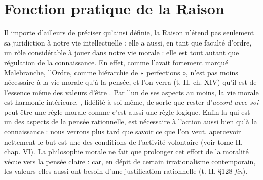 \section{Fonction pratique de la Raison}%
Il importe d’ailleurs
de préciser qu’ainsi définie, la Raison n’étend pas seulement sa juridiction à notre vie intellectuelle : elle a aussi, en tant que faculté
d’ordre, un rôle considérable à jouer dans notre vie morale : elle est
 tout autant que régulation de la connaissance.
En effet, comme l'avait fortement marqué Malebranche, l'Ordre,
comme hiérarchie de « perfections », n’est pas moins nécessaire à la
vie morale qu’à la pensée, et l’on verra (t. II, ch. XIV) qu’il est
de l'essence même des valeurs d’être . Par l’un de ses
aspects au moins, la vie morale est harmonie intérieure, ,
fidélité à soi-même, de sorte que rester d’{\it accord avec soi} peut être
une règle morale comme c’est aussi une règle logique. Enfin la  qui est un des aspects de la pensée rationnelle, est nécessaire
à l’action aussi bien qu’à la connaissance : nous verrons plus tard
que savoir ce que l’on veut, apercevoir nettement le but est une des
conditions de l’activité volontaire (voir tome II, chap. VI). La
philosophie morale ne fait que prolonger cet effort de la moralité
vécue vers la pensée claire : car, en dépit de certain irrationalisme
contemporain, les valeurs elles aussi ont besoin d’une justification
rationnelle (t. II, \S 128 {\it fin}).

